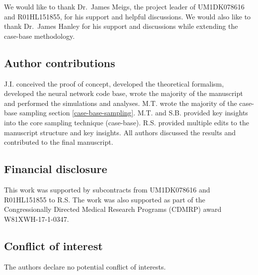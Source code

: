 \documentclass[preprint,12pt]{elsarticle}
\begin{document}
We would like to thank Dr.~James Meigs, the project leader of UM1DK078616 and R01HL151855, for his support and helpful discussions.
We would also like to thank Dr.~James Hanley for his support and discussions while extending the case-base methodology.

\subsection*{Author contributions}

J.I. conceived the proof of concept, developed the theoretical formalism, developed the neural network code base,
wrote the majority of the manuscript and performed the simulations and analyses. M.T. wrote the majority of the case-base sampling section \ref{case-base-sampling}.
M.T. and S.B. provided key insights into the core sampling technique (case-base). R.S. provided multiple edits to the manuscript structure and key insights. All authors
discussed the results and contributed to the final manuscript.

\subsection*{Financial disclosure}

This work was supported by subcontracts from UM1DK078616 and R01HL151855
to R.S. The work was also supported as part of the Congressionally Directed Medical Research Programs (CDMRP) award W81XWH-17-1-0347.
\subsection*{Conflict of interest}

The authors declare no potential conflict of interests.


  
 





\end{document}
